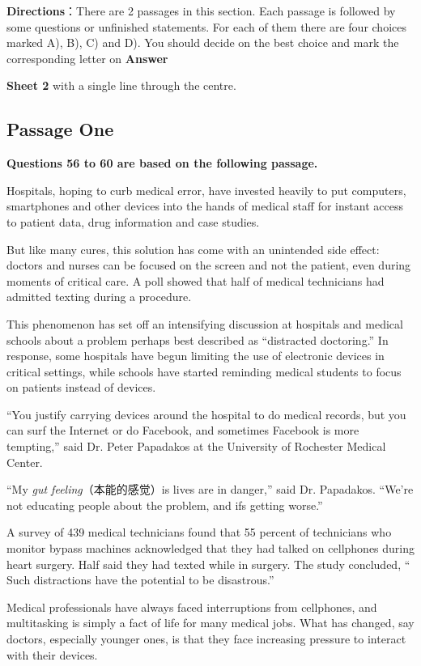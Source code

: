 \documentclass[UTF8,11pt]{ctexart}
\begin{document}
\textbf{Directions}：There are 2 passages in this section. Each passage is followed by some questions or unfinished statements. For each of them there are four choices marked A), B), C) and D). You should decide on the best choice and mark the corresponding letter on\textbf{ Answer}


\textbf{Sheet 2} with a single line through the centre.


\subsection*{Passage One}


\textbf{Questions 56 to 60 are based on the following passage.}


Hospitals, hoping to curb medical error, have invested heavily to put computers, smartphones and other devices into the hands of medical staff for instant access to patient data, drug information and case studies.


But like many cures, this solution has come with an unintended side effect: doctors and nurses can be focused on the screen and not the patient, even during moments of critical care. A poll showed that half of medical technicians had admitted texting during a procedure.


This phenomenon has set off an intensifying discussion at hospitals and medical schools about a problem perhaps best described as “distracted doctoring.” In response, some hospitals have begun limiting the use of electronic devices in critical settings, while schools have started reminding medical students to focus on patients instead of devices.


“You justify carrying devices around the hospital to do medical records, but you can surf the Internet or do Facebook, and sometimes Facebook is more tempting,” said Dr. Peter Papadakos at the University of Rochester Medical Center.


“My\textit{ gut feeling}（本能的感觉）is lives are in danger,” said Dr. Papadakos. “We’re not educating people about the problem, and ifs getting worse.”


A survey of 439 medical technicians found that 55 percent of technicians who monitor bypass machines acknowledged that they had talked on cellphones during heart surgery. Half said they had texted while in surgery. The study concluded, “ Such distractions have the potential to be disastrous.”


Medical professionals have always faced interruptions from cellphones, and multitasking is simply a fact of life for many medical jobs. What has changed, say doctors, especially younger ones, is that they face increasing pressure to interact with their devices.
\end{document}
